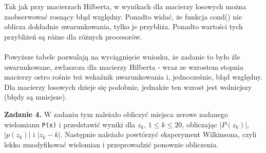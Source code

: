 \documentclass[15pt, a4paper]{article}
\begin{document}
\vspace{0.5cm}

\noindent Tak jak przy macierzach Hilberta, w wynikach dla macierzy losowych można zaobserwować rosnący błąd względny. Ponadto widać, że funkcja cond() nie oblicza dokładnie uwarunkowania, tylko je przybliża. Ponadto wartości tych przybliżeń są różne dla różnych procesorów. \\\\
\noindent Powyższe tabele pozwalają na wyciągnięcie wniosku, że zadanie to było źle uwarunkowane, zwłaszcza dla macierzy Hilberta - wraz ze wzrostem stopnia macierzy ostro rośnie też wskaźnik uwarunkowania i, jednocześnie, błąd względny. Dla macierzy losowych dzieje się podobnie, jednakże ten wzrost jest wolniejszy (błędy są mniejsze).

\vspace{0.5cm}

\noindent\hrulefill


\vspace{0.5cm}

\noindent\textbf{Zadanie 4.} W zadaniu tym należało obliczyć miejsca zerowe zadanego wielomianu \verb|P(x)| i przedstawić wyniki dla \( z_k \), \( 1 \leq k \leq 20 \), obliczając \( |P(z_k)| \), \( |p(z_k)| \) i \( |z_k - k| \). Następnie należało powtórzyć eksperyment Wilkinsona, czyli lekko zmodyfikować wielomian i przeprowadzić ponownie obliczenia.

\vspace{0.5cm}
\end{document}
